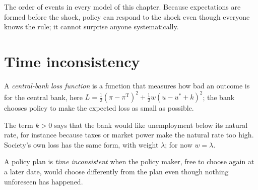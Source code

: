 \begin{omfigure}

{\small The order of events in every model of this chapter. Because expectations are formed before the shock, policy can
respond to the shock even though everyone knows the rule; it cannot surprise anyone systematically.}
\end{omfigure}

\section{Time inconsistency}\label{sec:b2:expectations-and-lucas-critique:time}

\begin{definition}\label{def:b2:expectations-and-lucas-critique:loss}
A \emph{central-bank loss function} is a function that measures how bad an outcome is
for the central bank, here $L = \tfrac12(\pi - \pi^{\mathrm T})^2 + \tfrac12 w(u - u^* + k)^2$; the bank chooses policy to make the expected loss as small as
possible.
\end{definition}

The term $k > 0$ says that the bank would like unemployment below its natural rate, for instance because taxes or market
power make the natural rate too high. Society's own loss has the same form, with weight $\lambda$; for now $w = \lambda$.

\begin{definition}\label{def:b2:expectations-and-lucas-critique:time-inconsistency}
A policy plan is \emph{time inconsistent} when the policy maker, free to choose again at a later
date, would choose differently from the plan even though nothing unforeseen has happened.
\end{definition}

